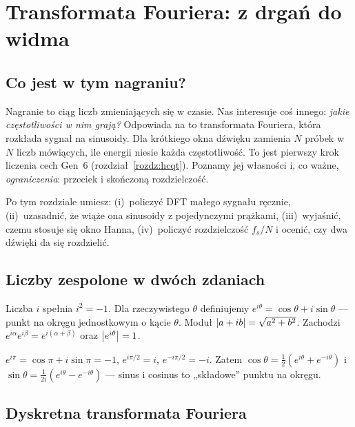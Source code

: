 \chapter{Transformata Fouriera: z drgań do widma}\label{rozdz:fourier}

\section{Co jest w tym nagraniu?}

Nagranie to ciąg liczb zmieniających się w czasie. Nas interesuje coś innego: \emph{jakie częstotliwości w nim
grają?} Odpowiada na to transformata Fouriera, która rozkłada sygnał na sinusoidy. Dla krótkiego okna dźwięku
zamienia $N$ próbek w $N$ liczb mówiących, ile energii niesie każda częstotliwość. To jest pierwszy krok liczenia cech
Gen~6 (rozdział~\ref{rozdz:hcqt}). Poznamy jej własności i, co ważne, \emph{ograniczenia}: przeciek i skończoną rozdzielczość.

Po tym rozdziale umiesz: (i)~policzyć DFT małego sygnału ręcznie, (ii)~uzasadnić, że wiąże ona sinusoidy z pojedynczymi prążkami,
(iii)~wyjaśnić, czemu stosuje się okno Hanna, (iv)~policzyć rozdzielczość $f_s/N$ i ocenić, czy dwa dźwięki da się rozdzielić.

\section{Liczby zespolone w dwóch zdaniach}

\begin{definicja}\label{def:euler}
Liczba $i$ spełnia $i^2=-1$. Dla rzeczywistego $\theta$ definiujemy
$e^{i\theta}=\cos\theta+i\sin\theta$ --- punkt na okręgu jednostkowym o kącie $\theta$.
Moduł $\left\lvert a+ib\right\rvert=\sqrt{a^2+b^2}$. Zachodzi $e^{i\alpha}e^{i\beta}=e^{i(\alpha+\beta)}$ oraz $\left\lvert e^{i\theta}\right\rvert=1$.
\end{definicja}

\begin{przyklad}\label{prz:euler}
$e^{i\pi}=\cos\pi+i\sin\pi=-1$, $e^{i\pi/2}=i$, $e^{-i\pi/2}=-i$. Zatem
$\cos\theta=\tfrac12(e^{i\theta}+e^{-i\theta})$ i $\sin\theta=\tfrac1{2i}(e^{i\theta}-e^{-i\theta})$ --- sinus i cosinus to
„składowe” punktu na okręgu.
\end{przyklad}

\section{Dyskretna transformata Fouriera}

